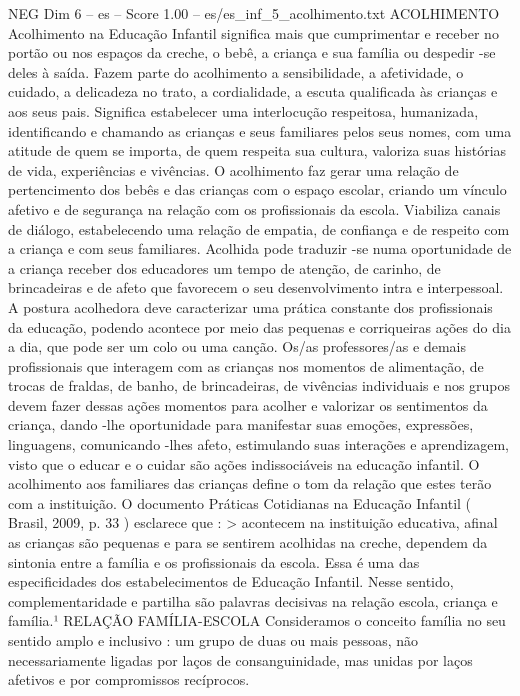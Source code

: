 \begin{textsample}{NEG Dim 6 – es – Score 1.00 – es/es\_inf\_5\_acolhimento.txt}  \label{ex:f6_neg_149}
ACOLHIMENTO Acolhimento na Educação Infantil significa mais que cumprimentar e receber no portão ou nos espaços da creche, o bebê, a criança e sua família ou despedir -se deles à saída.
Fazem parte do acolhimento a sensibilidade, a afetividade, o cuidado, a delicadeza no trato, a cordialidade, a escuta qualificada às crianças e aos seus pais.
Significa estabelecer uma interlocução respeitosa, humanizada, identificando e chamando as crianças e seus familiares pelos seus nomes, com uma atitude de quem se importa, de quem respeita sua cultura, valoriza suas histórias de vida, experiências e vivências.
O acolhimento faz gerar uma relação de pertencimento dos bebês e das crianças com o espaço escolar, criando um vínculo afetivo e de segurança na relação com os profissionais da escola.
Viabiliza canais de diálogo, estabelecendo uma relação de empatia, de confiança e de respeito com a criança e com seus familiares.
Acolhida pode traduzir -se numa oportunidade de a criança receber dos educadores um tempo de atenção, de carinho, de brincadeiras e de afeto que favorecem o seu desenvolvimento intra e interpessoal.
A postura acolhedora deve caracterizar uma prática constante dos profissionais da educação, podendo acontece por meio das pequenas e corriqueiras ações do dia a dia, que pode ser um colo ou uma canção.
Os/as professores/as e demais profissionais que interagem com as crianças nos momentos de alimentação, de trocas de fraldas, de banho, de brincadeiras, de vivências individuais e nos grupos devem fazer dessas ações momentos para acolher e valorizar os sentimentos da criança, dando -lhe oportunidade para manifestar suas emoções, expressões, linguagens, comunicando -lhes afeto, estimulando suas interações e aprendizagem, visto que o educar e o cuidar são ações indissociáveis na educação infantil.
O acolhimento aos familiares das crianças define o tom da relação que estes terão com a instituição.
O documento Práticas Cotidianas na Educação Infantil ( Brasil, 2009, p. 33 ) esclarece que : > acontecem na instituição educativa, afinal as crianças são pequenas e para se sentirem acolhidas na creche, dependem da sintonia entre a família e os profissionais da escola.
Essa é uma das especificidades dos estabelecimentos de Educação Infantil.
Nesse sentido, complementaridade e partilha são palavras decisivas na relação escola, criança e família.¹ RELAÇÃO FAMÍLIA-ESCOLA Consideramos o conceito família no seu sentido amplo e inclusivo : um grupo de duas ou mais pessoas, não necessariamente ligadas por laços de consanguinidade, mas unidas por laços afetivos e por compromissos recíprocos.

\end{textsample}
